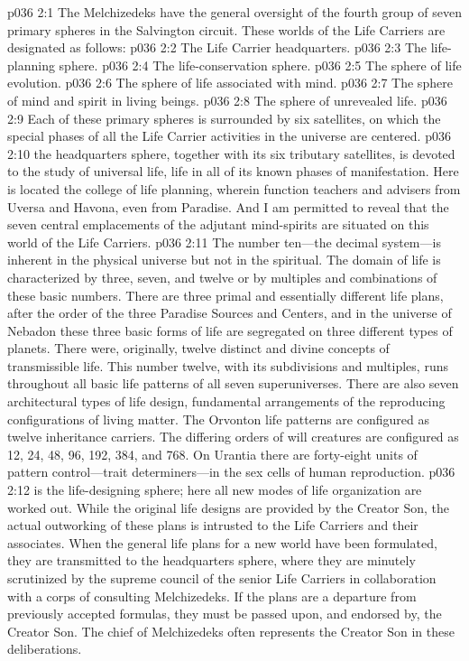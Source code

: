 \vs p036 2:1 The Melchizedeks have the general oversight of the fourth group of seven primary spheres in the Salvington circuit. These worlds of the Life Carriers are designated as follows:
\pc \vs p036 2:2 \bibnobreakspace The Life Carrier headquarters.
\vs p036 2:3 \bibnobreakspace The life\hyp{}planning sphere.
\vs p036 2:4 \bibnobreakspace The life\hyp{}conservation sphere.
\vs p036 2:5 \bibnobreakspace The sphere of life evolution.
\vs p036 2:6 \bibnobreakspace The sphere of life associated with mind.
\vs p036 2:7 \bibnobreakspace The sphere of mind and spirit in living beings.
\vs p036 2:8 \bibnobreakspace The sphere of unrevealed life.
\pc \vs p036 2:9 Each of these primary spheres is surrounded by six satellites, on which the special phases of all the Life Carrier activities in the universe are centered.
\pc \vs p036 2:10  the headquarters sphere, together with its six tributary satellites, is devoted to the study of universal life, life in all of its known phases of manifestation. Here is located the college of life planning, wherein function teachers and advisers from Uversa and Havona, even from Paradise. And I am permitted to reveal that the seven central emplacements of the adjutant mind\hyp{}spirits are situated on this world of the Life Carriers.
\vs p036 2:11 The number ten---the decimal system---is inherent in the physical universe but not in the spiritual. The domain of life is characterized by three, seven, and twelve or by multiples and combinations of these basic numbers. There are three primal and essentially different life plans, after the order of the three Paradise Sources and Centers, and in the universe of Nebadon these three basic forms of life are segregated on three different types of planets. There were, originally, twelve distinct and divine concepts of transmissible life. This number twelve, with its subdivisions and multiples, runs throughout all basic life patterns of all seven superuniverses. There are also seven architectural types of life design, fundamental arrangements of the reproducing configurations of living matter. The Orvonton life patterns are configured as twelve inheritance carriers. The differing orders of will creatures are configured as 12, 24, 48, 96, 192, 384, and 768. On Urantia there are forty\hyp{}eight units of pattern control---trait determiners---in the sex cells of human reproduction.
\pc \vs p036 2:12  is the life\hyp{}designing sphere; here all new modes of life organization are worked out. While the original life designs are provided by the Creator Son, the actual outworking of these plans is intrusted to the Life Carriers and their associates. When the general life plans for a new world have been formulated, they are transmitted to the headquarters sphere, where they are minutely scrutinized by the supreme council of the senior Life Carriers in collaboration with a corps of consulting Melchizedeks. If the plans are a departure from previously accepted formulas, they must be passed upon, and endorsed by, the Creator Son. The chief of Melchizedeks often represents the Creator Son in these deliberations.\plusone
